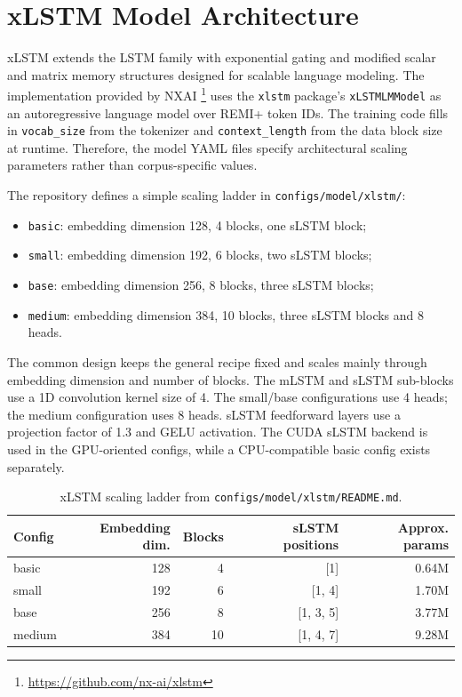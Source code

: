 \section{xLSTM Model Architecture}

xLSTM \citep{beckXLSTMExtendedLong2024} extends the LSTM \citep{hochreiterLongShortTermMemory1997} family with exponential gating and modified scalar and matrix memory structures designed for scalable language modeling. The implementation provided by NXAI \footnote{\url{https://github.com/nx-ai/xlstm}} uses the \verb|xlstm| package's \verb|xLSTMLMModel| as an autoregressive language model over REMI+ token IDs. The training code fills in \verb|vocab_size| from the tokenizer and \verb|context_length| from the data block size at runtime. Therefore, the model YAML files specify architectural scaling parameters rather than corpus-specific values.

The repository defines a simple scaling ladder in \verb|configs/model/xlstm/|:
\begin{itemize}
	\item \verb|basic|: embedding dimension 128, 4 blocks, one sLSTM block;
	\item \verb|small|: embedding dimension 192, 6 blocks, two sLSTM blocks;
	\item \verb|base|: embedding dimension 256, 8 blocks, three sLSTM blocks;
	\item \verb|medium|: embedding dimension 384, 10 blocks, three sLSTM blocks and 8 heads.
\end{itemize}

The common design keeps the general recipe fixed and scales mainly through embedding dimension and number of blocks. The mLSTM and sLSTM sub-blocks use a 1D convolution kernel size of 4. The small/base configurations use 4 heads; the medium configuration uses 8 heads. sLSTM feedforward layers use a projection factor of 1.3 and GELU activation. The CUDA sLSTM backend is used in the GPU-oriented configs, while a CPU-compatible basic config exists separately.

\begin{table}[htbp]
	\centering
	\begin{tabular}{lrrrr}
		\toprule
		Config & Embedding dim. & Blocks & sLSTM positions & Approx. params \\
		\midrule
		basic  & 128            & 4      & [1]             & 0.64M          \\
		small  & 192            & 6      & [1, 4]          & 1.70M          \\
		base   & 256            & 8      & [1, 3, 5]       & 3.77M          \\
		medium & 384            & 10     & [1, 4, 7]       & 9.28M          \\
		\bottomrule
	\end{tabular}
	\caption{xLSTM scaling ladder from \texttt{configs/model/xlstm/README.md}.}
	\label{tab:xlstm_scale}

\end{table}

